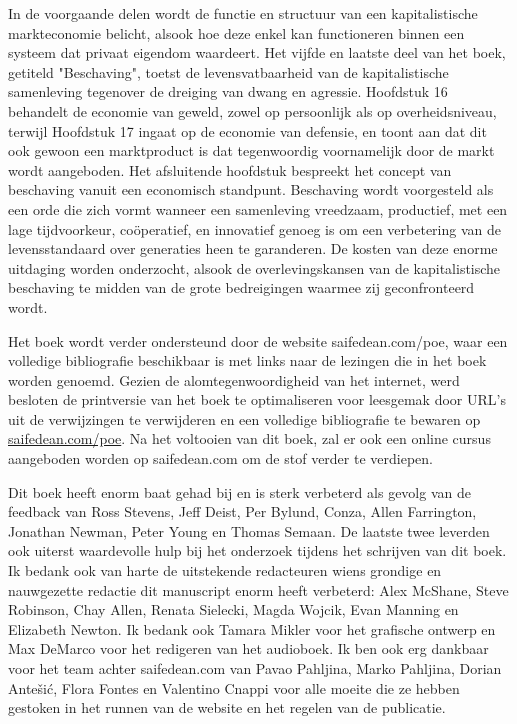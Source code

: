 In de voorgaande delen wordt de functie en structuur van een kapitalistische markteconomie belicht, alsook hoe deze enkel kan functioneren binnen een systeem dat privaat eigendom waardeert. Het vijfde en laatste deel van het boek, getiteld "Beschaving", toetst de levensvatbaarheid van de kapitalistische samenleving tegenover de dreiging van dwang en agressie. Hoofdstuk 16 behandelt de economie van geweld, zowel op persoonlijk als op overheidsniveau, terwijl Hoofdstuk 17 ingaat op de economie van defensie, en toont aan dat dit ook gewoon een marktproduct is dat tegenwoordig voornamelijk door de markt wordt aangeboden. Het afsluitende hoofdstuk bespreekt het concept van beschaving vanuit een economisch standpunt. Beschaving wordt voorgesteld als een orde die zich vormt wanneer een samenleving vreedzaam, productief, met een lage tijdvoorkeur, coöperatief, en innovatief genoeg is om een verbetering van de levensstandaard over generaties heen te garanderen. De kosten van deze enorme uitdaging worden onderzocht, alsook de overlevingskansen van de kapitalistische beschaving te midden van de grote bedreigingen waarmee zij geconfronteerd wordt.

Het boek wordt verder ondersteund door de website saifedean.com/poe, waar een volledige bibliografie beschikbaar is met links naar de lezingen die in het boek worden genoemd. Gezien de alomtegenwoordigheid van het internet, werd besloten de printversie van het boek te optimaliseren voor leesgemak door URL's uit de verwijzingen te verwijderen en een volledige bibliografie te bewaren op \href{saifedean.com/poe}{saifedean.com/poe}. Na het voltooien van dit boek, zal er ook een online cursus aangeboden worden op saifedean.com om de stof verder te verdiepen.

Dit boek heeft enorm baat gehad bij en is sterk verbeterd als gevolg van de feedback van Ross Stevens, Jeff Deist, Per Bylund, Conza, Allen Farrington, Jonathan Newman, Peter Young en Thomas Semaan. De laatste twee leverden ook uiterst waardevolle hulp bij het onderzoek tijdens het schrijven van dit boek. Ik bedank ook van harte de uitstekende redacteuren wiens grondige en nauwgezette redactie dit manuscript enorm heeft verbeterd: Alex McShane, Steve Robinson, Chay Allen, Renata Sielecki, Magda Wojcik, Evan Manning en Elizabeth Newton. Ik bedank ook Tamara Mikler voor het grafische ontwerp en Max DeMarco voor het redigeren van het audioboek. Ik ben ook erg dankbaar voor het team achter saifedean.com van Pavao Pahljina, Marko Pahljina, Dorian Antešić, Flora Fontes en Valentino Cnappi voor alle moeite die ze hebben gestoken in het runnen van de website en het regelen van de publicatie.


